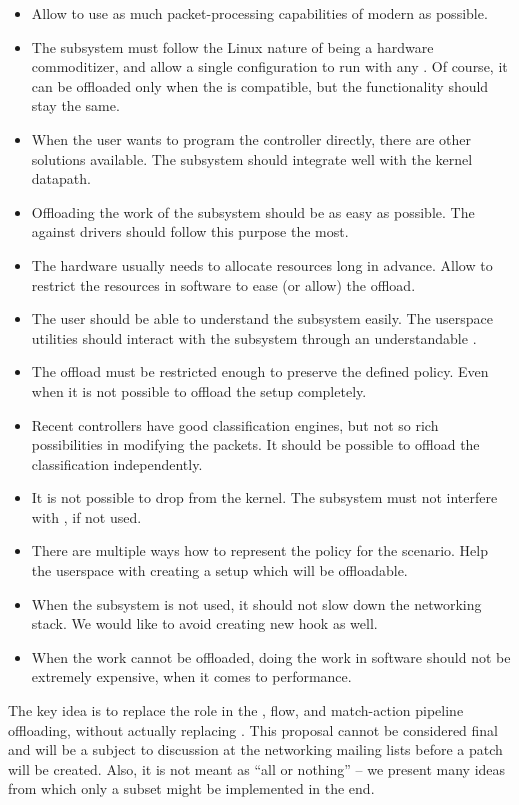 \begin{itemize}
	\item Allow to use as much packet-processing capabilities of modern 
		as possible.
	\item The subsystem must follow the Linux nature of being a hardware
		commoditizer, and allow a single configuration to run with any .
		Of course, it can be offloaded only when the  is compatible, but
		the functionality should stay the same.
	\item When the user wants to program the controller directly, there are
		other solutions available. The subsystem should integrate well with the
		kernel datapath.
	\item Offloading the work of the subsystem should be as easy as possible.
		The  against drivers should follow this purpose the most.
	\item The hardware usually needs to allocate resources long in advance.
		Allow to restrict the resources in software to ease (or allow) the
		offload.
	\item The user should be able to understand the subsystem easily. The
		userspace utilities should interact with the subsystem through an
		understandable .
	\item The offload must be restricted enough to preserve the defined policy.
		Even when it is not possible to offload the setup completely.
	\item Recent controllers have good classification engines, but not so rich
		possibilities in modifying the packets. It should be possible to
		offload the classification independently.
	\item It is not possible to drop  from the kernel. The subsystem must
		not interfere with , if not used.
	\item There are multiple ways how to represent the policy for the scenario.
		Help the userspace with creating a setup which will be offloadable.
	\item When the subsystem is not used, it should not slow down the
		networking stack. We would like to avoid creating new hook as well.
	\item When the work cannot be offloaded, doing the work in software should
		not be extremely expensive, when it comes to performance.
\end{itemize}

\noindent The key idea is to replace the  role in the , flow, and
match-action pipeline offloading,
without actually replacing . This proposal cannot be considered final and
will be a subject to discussion at the networking mailing lists before a patch
will be created. Also, it is not meant as ``all or nothing'' -- we present many
ideas from which only a subset might be implemented in the end.

